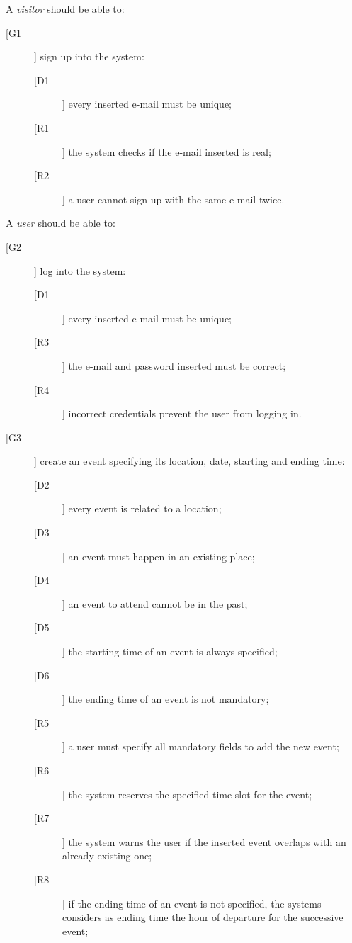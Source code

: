A \textit{visitor} should be able to:
\begin{description}
\item[[G1]] sign up into the system:
	\begin{description}
	\item[[D1]] every inserted e-mail must be unique;
	\newline
	\item[[R1]] the system checks if the e-mail inserted is real;
	\item[[R2]] a user cannot sign up with the same e-mail twice.
	\end{description}
\end{description}

\noindent A \textit{user} should be able to:
\begin{description}
\item[[G2]] log into the system:
	\begin{description}
	\item[[D1]] every inserted e-mail must be unique;
	\newline
	\item[[R3]] the e-mail and password inserted must be correct;
	\item[[R4]] incorrect credentials prevent the user from logging in.
	\end{description}
\item[[G3]] create an event specifying its location, date, starting and ending time:
	\begin{description}
	\item[[D2]] every event is related to a location;
	\item[[D3]] an event must happen in an existing place;
	\item[[D4]] an event to attend cannot be in the past;
	\item[[D5]] the starting time of an event is always specified;
	\item[[D6]] the ending time of an event is not mandatory;
	\newline
	\item[[R5]] a user must specify all mandatory fields to add the new event;
	\item[[R6]] the system reserves the specified time-slot for the event;
	\item[[R7]] the system warns the user if the inserted event overlaps with an already existing one;
	\item[[R8]] if the ending time of an event is not specified, the systems considers as ending time the hour of departure for the successive event;

\end{description}
\end{description}
